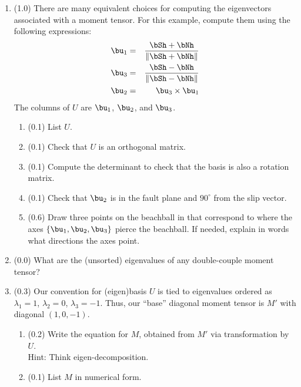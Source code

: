 \documentclass[11pt,titlepage,fleqn]{article}
\newcommand{\Umat}{U}
\newcommand{\Mmat}{M}
\begin{document}
\begin{enumerate}
\item (1.0) There are many equivalent choices for computing the eigenvectors associated with a moment tensor. For this example, compute them using the following expressions:
%
\begin{eqnarray*}
\bu_1 &=& \frac{\bSh + \bNh}{\| \bSh + \bNh \|}
\\
\bu_3 &=& \frac{\bSh - \bNh}{\| \bSh - \bNh \|}
\\
\bu_2 &=& \bu_3  \times \bu_1
\end{eqnarray*}
%
The columns of $\Umat$ are $\bu_1$, $\bu_2$, and $\bu_3$.
%
\begin{enumerate}
\item (0.1) List $\Umat$.
\item (0.1) Check that $\Umat$ is an orthogonal matrix.
\item (0.1) Compute the determinant to check that the basis is also a rotation matrix.
\item (0.1) Check that $\bu_2$ is in the fault plane and $90^\circ$ from the slip vector.
\item (0.6) Draw three points on the beachball in  that correspond to where the axes $\{\bu_1,\bu_2,\bu_3\}$ pierce the beachball. If needed, explain in words what directions the axes point.
\end{enumerate}


\item (0.0) What are the (unsorted) eigenvalues of any double-couple moment tensor?


\item (0.3) Our convention for (eigen)basis $\Umat$ is tied to eigenvalues ordered as $\lambda_1 = 1$, $\lambda_2 = 0$, $\lambda_3 = -1$. Thus, our ``base'' diagonal moment tensor is $\Mmat'$ with diagonal $(1, 0, -1)$.
%
\begin{enumerate}
\item (0.2) Write the equation for $\Mmat$, obtained from $\Mmat'$ via transformation by $\Umat$. \\
Hint: Think eigen-decomposition.
\item (0.1) List $\Mmat$ in numerical form.
\end{enumerate}

\end{enumerate}

\end{document}
